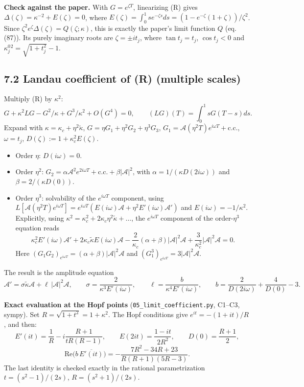 \documentclass[11pt,a4paper]{report}
\begin{document}
\textbf{Check against the paper.} With \(G=e^{\zeta T}\), linearizing (R) gives
\(\Delta(\zeta)=\kappa^{-2}+E(\zeta)=0\), where \(E(\zeta)=\int_0^1se^{-\zeta s}ds=(1-e^{-\zeta}(1+\zeta))/\zeta^2\).
Since \(\zeta^2e^\zeta\Delta(\zeta)=Q(\zeta;\kappa)\), this is exactly the paper's limit function \(Q\)
(eq. (87)). Its purely imaginary roots are \(\zeta=\pm it_j\), where \(\tan t_j=t_j\), \(\cos t_j<0\) and
\(\kappa_j^0{}^2=\sqrt{1+t_j^2}-1\).

\subsection{7.2 Landau coefficient of (R) (multiple scales)}

Multiply (R) by \(\kappa^2\):
\[G+\kappa^2LG-G^2/\kappa+G^3/\kappa^2+O(G^4)=0,\qquad (LG)(T)=\int_0^1sG(T-s)ds .\]
Expand with \(\kappa=\kappa_c+\eta^2\tilde\kappa\), \(G=\eta G_1+\eta^2G_2+\eta^3G_3\),
\(G_1=\mathcal A(\eta^2T)e^{i\omega T}+\text{c.c.}\), \(\omega=t_j\), \(D(\zeta):=1+\kappa_c^2E(\zeta)\).
\begin{itemize}
\tightlist
\item Order \(\eta\): \(D(i\omega)=0\).
\item Order \(\eta^2\): \(G_2=\alpha\mathcal A^2e^{2i\omega T}+\text{c.c.}+\beta|\mathcal A|^2\), with
\(\alpha=1/(\kappa D(2i\omega))\) and \(\beta=2/(\kappa D(0))\).
\item Order \(\eta^3\): solvability of the \(e^{i\omega T}\) component, using \(L[\mathcal A(\eta^2T)e^{i\omega T}]
  =e^{i\omega T}(E(i\omega)\mathcal A+\eta^2E'(i\omega)\mathcal A')\) and \(E(i\omega)=-1/\kappa^2\).
Explicitly, using \(\kappa^2=\kappa_c^2+2\kappa_c\eta^2\tilde\kappa+\dots\), the \(e^{i\omega T}\) component of the
order-\(\eta^3\) equation reads
\[\kappa_c^2E'(i\omega)\mathcal A'+2\kappa_c\tilde\kappa E(i\omega)\mathcal A-\frac2{\kappa_c}(\alpha+\beta)|\mathcal A|^2\mathcal A+\frac3{\kappa_c^2}|\mathcal A|^2\mathcal A=0 .\]
Here \((G_1G_2)_{e^{i\omega T}}=(\alpha+\beta)|\mathcal A|^2\mathcal A\) and
\((G_1^3)_{e^{i\omega T}}=3|\mathcal A|^2\mathcal A\).
\end{itemize}

The result is the amplitude equation
\[\mathcal A'=\sigma\tilde\kappa\mathcal A+\ell\,|\mathcal A|^2\mathcal A,\qquad
\sigma=\frac{2}{\kappa^3E'(i\omega)},\qquad
\ell=\frac{b}{\kappa^4E'(i\omega)},\qquad b=\frac2{D(2i\omega)}+\frac4{D(0)}-3 .\]

\textbf{Exact evaluation at the Hopf points} (\texttt{05\_limit\_coefficient.py}, C1--C3, sympy). Set \(R=\sqrt{1+t^2}=1+\kappa^2\).
The Hopf conditions give \(e^{it}=-(1+it)/R\), and then:
\[E'(it)=\frac1R-i\frac{R+1}{tR(R-1)},\qquad E(2it)=\frac{1-it}{2R^2},\qquad D(0)=\frac{R+1}2,\]
\[\mathrm{Re}\big(b\,\overline{E'(it)}\big)=-\frac{7R^2-34R+23}{R(R+1)(5R-3)} .\]
The last identity is checked exactly in the rational parametrization \(t=(s^2-1)/(2s)\), \(R=(s^2+1)/(2s)\).
\end{document}
